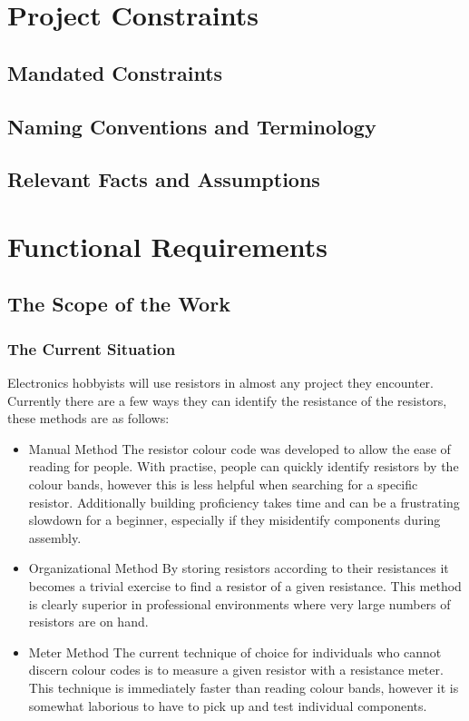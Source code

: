 \documentclass{article}
\begin{document}
\section{Project Constraints}

\subsection{Mandated Constraints}
\subsection{Naming Conventions and Terminology }
\subsection{Relevant Facts and Assumptions}


\section{Functional Requirements}

\subsection{The Scope of the Work}

\subsubsection{The Current Situation}

Electronics hobbyists will use resistors in almost any project they encounter.
Currently there are a few ways they can identify the resistance of the resistors, these methods are as follows:
\begin{itemize}

\item Manual Method
\subitem The resistor colour code was developed to allow the ease of reading for people. 
With practise, people can quickly identify resistors by the colour bands, however this is less helpful when searching  for a specific resistor.
Additionally building proficiency takes time and can be a frustrating slowdown for a beginner, especially if they misidentify components during assembly.

\item Organizational Method
\subitem By storing resistors according to their resistances it becomes a trivial exercise to find a resistor of a given resistance.
This method is clearly superior in professional environments where very large numbers of resistors are on hand.

\item Meter Method
\subitem The current technique of choice for individuals who cannot discern colour codes is to measure a given resistor with a resistance meter.
This technique is immediately faster than reading colour bands, however it is somewhat laborious to have to pick up and test individual components.

\end{itemize}
\end{document}
